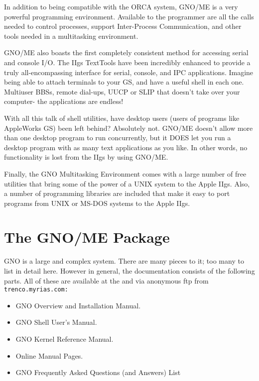\documentclass{report}
\begin{document}
In addition to being compatible with the
ORCA system, GNO/ME is a very powerful programming environment.
Available to the programmer are all the calls needed to control
processes, support Inter-Process Communication, and other tools
needed in a multitasking environment.

GNO/ME also boasts the first completely
consistent method for accessing serial and console I/O. The IIgs
TextTools have been incredibly enhanced to provide a truly
all-encompassing interface for serial, console, and IPC
applications. Imagine being able to attach terminals to your GS,
and have a useful shell in each one. Multiuser BBSs, remote
dial-ups, UUCP or SLIP that doesn't take over your computer- the
applications are endless!

With all this talk of shell utilities, have
desktop users (users of programs like AppleWorks GS) been left
behind? Absolutely not. GNO/ME doesn't allow more than one
desktop program to run concurrently, but it DOES let you run a
desktop program with as many text applications as you like. In
other words, no functionality is lost from the IIgs by using
GNO/ME.

Finally, the GNO Multitasking Environment
comes with a large number of free utilities that bring some of
the power of a UNIX system to the Apple IIgs. Also, a number of
programming libraries are included that make it easy to port
programs from UNIX or MS-DOS systems to the Apple IIgs.

\section{The GNO/ME Package}

GNO is a large and complex system.  There are many pieces to it;
too many to list in detail here.  However in general, the documentation
consists of the following parts.  All of these are available 
at the  and via anonymous ftp from
\tt trenco.myrias.com\rm:

\begin{itemize}
\item	GNO Overview and Installation Manual.
\item	GNO Shell User's Manual.
\item	GNO Kernel Reference Manual.
\item	Online Manual Pages.
\item	GNO Frequently Asked Questions (and Answers) List
\end{itemize}
\end{document}

